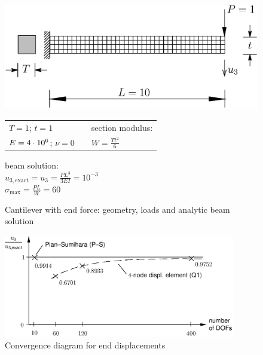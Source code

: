 \begin{figure}[H]
\begin{multicols}{2}
\begin{flushleft}
    \includegraphics[width=0.9\linewidth]{eps/cantilever-with-end-force_b}
\end{flushleft}
\columnbreak

\begin{tabular}{lcl}
  $T=1$;  $t=1$  & & section modulus: 
\\
  $E=4\cdot 10^{6}$; $\nu=0$ & & $W=\frac{T t^{2}}{6}$
\end{tabular}
\vspace*{1.ex}

beam solution:\\
$u_{3,\text{exact}} = u_{3} = \frac{P L^{3}}{3EI} = 10^{-3}$ \\
$\sigma_{\text{max}} = \frac{PL}{W} = 60$
\end{multicols}
  \caption{Cantilever with end force: geometry, loads %
           and analytic beam solution}
  \label{wall1:fig:eas-cwef}
\end{figure}

\begin{figure}[H]
   \begin{center}
     \includegraphics[width=0.9\textwidth]{eps/convergence-diagram-for-end-displacements}
   \end{center}
  \caption{Convergence diagram for end displacements}
 \label{wall1:fig:eas-cdfed}
\end{figure}


